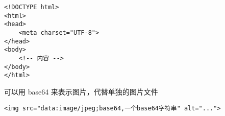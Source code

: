 
\begin{issues}
\issueDraft
\end{issues}

\begin{lstlisting}[language=none]
<!DOCTYPE html>
<html>
<head>
    <meta charset="UTF-8">
</head>
<body>
    <!-- 内容 -->
</body>
</html>
\end{lstlisting}

可以用 base64 来表示图片，代替单独的图片文件
\begin{lstlisting}[language=none]
<img src="data:image/jpeg;base64,一个base64字符串" alt="...">
\end{lstlisting}
